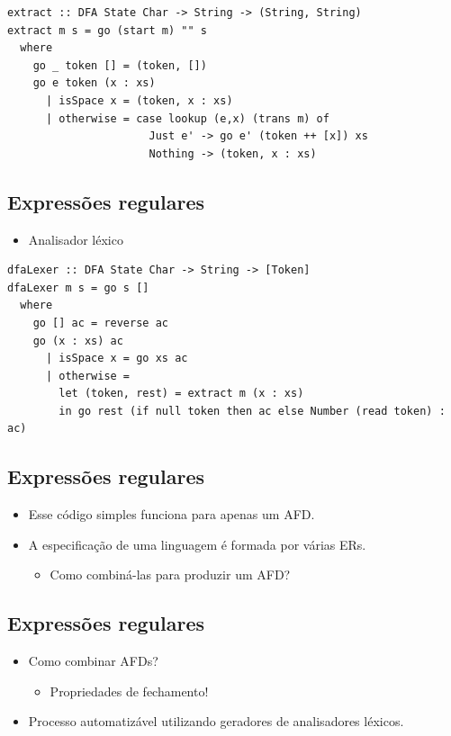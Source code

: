 \documentclass[11pt]{article}
\begin{document}
\begin{verbatim}
extract :: DFA State Char -> String -> (String, String)
extract m s = go (start m) "" s
  where
    go _ token [] = (token, [])
    go e token (x : xs)
      | isSpace x = (token, x : xs)
      | otherwise = case lookup (e,x) (trans m) of
                      Just e' -> go e' (token ++ [x]) xs
                      Nothing -> (token, x : xs)
\end{verbatim}
\subsection*{Expressões regulares}
\label{sec:org75c1be1}

\begin{itemize}
\item Analisador léxico
\end{itemize}

\begin{verbatim}
dfaLexer :: DFA State Char -> String -> [Token]
dfaLexer m s = go s []
  where
    go [] ac = reverse ac
    go (x : xs) ac
      | isSpace x = go xs ac
      | otherwise =
        let (token, rest) = extract m (x : xs)
        in go rest (if null token then ac else Number (read token) : ac)
\end{verbatim}
\subsection*{Expressões regulares}
\label{sec:org88c0205}

\begin{itemize}
\item Esse código simples funciona para apenas um AFD.

\item A especificação de uma linguagem é formada por várias ERs.
\begin{itemize}
\item Como combiná-las para produzir um AFD?
\end{itemize}
\end{itemize}
\subsection*{Expressões regulares}
\label{sec:orgeb362b4}

\begin{itemize}
\item Como combinar AFDs?
\begin{itemize}
\item Propriedades de fechamento!
\end{itemize}

\item Processo automatizável utilizando geradores de analisadores léxicos.
\end{itemize}
\end{document}
